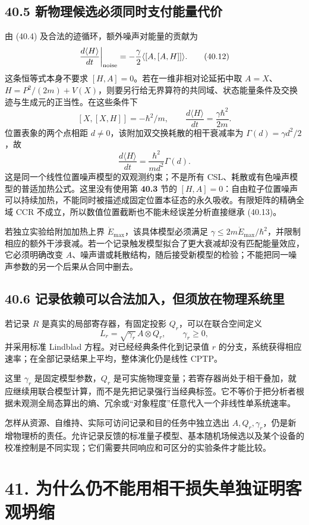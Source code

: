 \documentclass[
  11pt,
  oneside]{book}
\begin{document}
\section{40.5 新物理候选必须同时支付能量代价}

由 (40.4) 及合法的迹循环，额外噪声对能量的贡献为 \[
\frac{d\langle H\rangle}{dt}\bigg|_{\rm noise}
=-\frac\gamma2\langle[A,[A,H]]\rangle.
\tag{40.12}
\] 这条恒等式本身不要求 \([H,A]=0\)。若在一维非相对论延拓中取
\(A=X\)、\(H=P^2/(2m)+V(X)\)，则要另行给无界算符的共同域、状态能量条件及交换迹与生成元的正当性。在这些条件下
\[
[X,[X,H]]=-\hbar^2/m,
\qquad\frac{d\langle H\rangle}{dt}=\frac{\gamma\hbar^2}{2m}.
\tag{40.13}
\] 位置表象的两个点相距 \(d\ne0\)，该附加双交换耗散的相干衰减率为
\(\Gamma(d)=\gamma d^2/2\)，故 \[
\boxed{\frac{d\langle H\rangle}{dt}
=\frac{\hbar^2}{md^2}\Gamma(d).}
\tag{40.14}
\] 这是同一个线性位置噪声模型的双观测约束；不是所有
CSL、耗散或有色噪声模型的普适加热公式。这里没有使用第 \textbf{40.3} 节的
\([H,A]=0\)：自由粒子位置噪声可以持续加热，不能同时被描述成固定位置本征态的永久吸收。有限矩阵的精确全域
CCR 不成立，所以数值位置截断也不能未经误差分析直接继承 (40.13)。

若独立实验给附加加热上界 \(\dot E_{\max}\)，该具体模型必须满足
\(\gamma\le2m\dot E_{\max}/\hbar^2\)，并限制相应的额外干涉衰减。若一个记录触发模型拟合了更大衰减却没有匹配能量效应，它必须明确改变
\(A\)、噪声谱或耗散结构，随后接受新模型的检验；不能把同一噪声参数的另一个后果从合同中删去。

\section{40.6 记录依赖可以合法加入，但须放在物理系统里}

若记录 \(R\) 是真实的局部寄存器，有固定投影 \(Q_r\)，可以在联合空间定义
\[
L_r=\sqrt{\gamma_r}\,A\otimes Q_r,\qquad\gamma_r\ge0,
\] 并采用标准 Lindblad 方程。对已经经典条件化到记录值 \(r\)
的分支，系统获得相应速率；在全部记录结果上平均，整体演化仍是线性 CPTP。

这里 \(\gamma_r\) 是固定模型参数，\(Q_r\)
是可实施物理变量；若寄存器尚处于相干叠加，就应继续用联合模型计算，而不是先把记录强行当经典标签。它不等价于把分析者根据未观测全局态算出的熵、冗余或``对象程度''任意代入一个非线性单系统速率。

怎样从资源、自维持、实际可访问记录和目的任务中独立选出
\(A,Q_r,\gamma_r\)，仍是新增物理桥的责任。允许记录反馈的标准量子模型、基本随机场候选以及某个设备的校准控制是不同实现；它们需要共同响应和可区分的实验条件才能比较。

\chapter{41. 为什么仍不能用相干损失单独证明客观坍缩}\label{ch-41}\hypertarget{ch-41}{}
\end{document}
